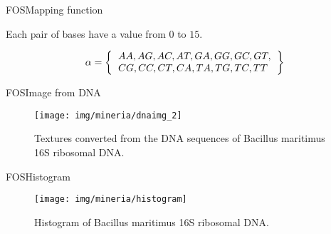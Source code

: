 \documentclass[10pt]{beamer}
\newcommand{\1}{
	\setbeamertemplate{background}{
		\texttt{[image: img/1\_dna]}
		\tikz[overlay] \fill[fill opacity=0.75,fill=white] (0,0) rectangle (-\paperwidth,\paperheight);
	}
}
\begin{document}
\begin{frame}{FOS}{Mapping function }
	\begin{block}{}
		Each pair of bases have a value from $0$ to $15$.
		
		\begin{equation}
		\alpha = \left\lbrace \begin{tabular}{l}
		$AA, AG, AC, AT, GA, GG, GC, GT,$\\
		$CG, CC, CT, CA, TA, TG, TC, TT$
		\end{tabular}      
		\right\rbrace
		\end{equation}
		
	\end{block}
\end{frame}


\begin{frame}{FOS}{Image from DNA}
	\begin{figure}[]
		\centering
		\texttt{[image: img/mineria/dnaimg\_2]}
		\label{img:mot2}
		\caption{Textures converted from the DNA sequences of Bacillus maritimus 16S ribosomal DNA.}
	\end{figure}
\end{frame}

\begin{frame}{FOS}{Histogram}
	\begin{figure}[]
		\centering
		\texttt{[image: img/mineria/histogram]}
		\label{img:mot2}
		\caption{Histogram of Bacillus maritimus 16S ribosomal DNA. }
	\end{figure}
\end{frame}
\end{document}
